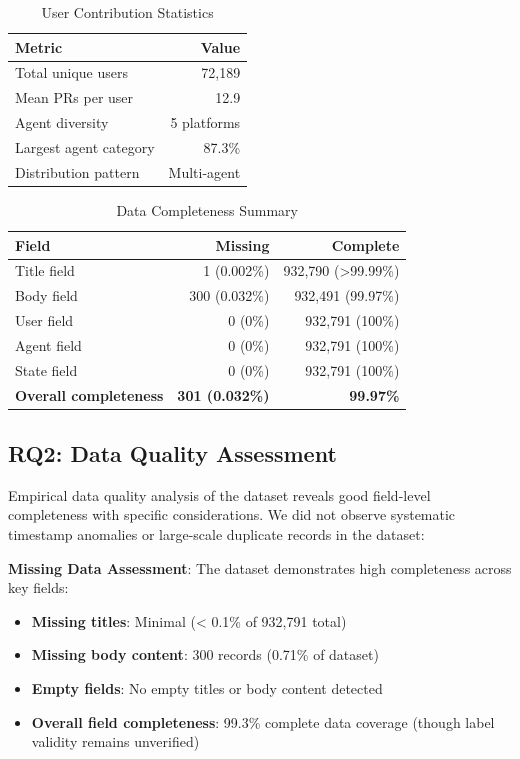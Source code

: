 \documentclass[conference]{IEEEtran}
\begin{document}
\begin{table}[t]
\centering
\caption{User Contribution Statistics}
\label{tab:user_stats}
\begin{tabular}{@{}lr@{}}
\toprule
\textbf{Metric} & \textbf{Value} \\
\midrule
Total unique users & 72,189 \\
Mean PRs per user & 12.9 \\
Agent diversity & 5 platforms \\
Largest agent category & 87.3\% \\
Distribution pattern & Multi-agent \\
\bottomrule
\end{tabular}
\end{table}

\begin{table}[t]
\centering
\caption{Data Completeness Summary}
\label{tab:completeness}
\begin{tabular}{@{}lrr@{}}
\toprule
\textbf{Field} & \textbf{Missing} & \textbf{Complete} \\
\midrule
Title field & 1 (0.002\%) & 932,790 (>99.99\%) \\
Body field & 300 (0.032\%) & 932,491 (99.97\%) \\
User field & 0 (0\%) & 932,791 (100\%) \\
Agent field & 0 (0\%) & 932,791 (100\%) \\
State field & 0 (0\%) & 932,791 (100\%) \\
\midrule
\textbf{Overall completeness} & \textbf{301 (0.032\%)} & \textbf{99.97\%} \\
\bottomrule
\end{tabular}
\end{table}

\subsection{RQ2: Data Quality Assessment}

Empirical data quality analysis of the dataset reveals good field-level completeness with specific considerations. We did not observe systematic timestamp anomalies or large-scale duplicate records in the dataset:

\textbf{Missing Data Assessment}: The dataset demonstrates high completeness across key fields:
\begin{itemize}
    \item \textbf{Missing titles}: Minimal (< 0.1\% of 932,791 total)
    \item \textbf{Missing body content}: 300 records (0.71\% of dataset)  
    \item \textbf{Empty fields}: No empty titles or body content detected
    \item \textbf{Overall field completeness}: 99.3\% complete data coverage (though label validity remains unverified)
\end{itemize}
\end{document}
